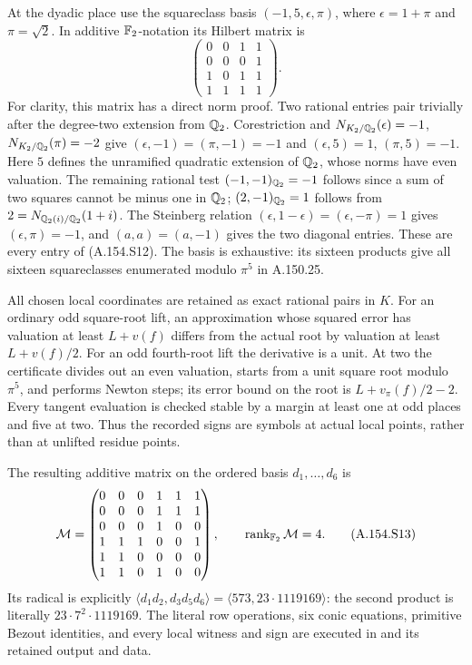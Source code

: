 At the dyadic place use the squareclass basis
\((-1,5,\epsilon,\pi)\), where
\(\epsilon=1+\pi\) and \(\pi=\sqrt2\).
In additive \(\mathbb F_2\)-notation its Hilbert matrix is
\[
 \begin{pmatrix}
 0&0&1&1\\
 0&0&0&1\\
 1&0&1&1\\
 1&1&1&1
 \end{pmatrix}.
\tag{A.154.S12}
\]
For clarity, this matrix has a direct norm proof.
Two rational entries pair trivially after the
degree-two extension from \(\mathbb Q_2\).
Corestriction and
\(N_{K_2/\mathbb Q_2}(\epsilon)=-1\),
\(N_{K_2/\mathbb Q_2}(\pi)=-2\) give
\((\epsilon,-1)=(\pi,-1)=-1\) and
\((\epsilon,5)=1\), \((\pi,5)=-1\).
Here \(5\) defines the unramified quadratic
extension of \(\mathbb Q_2\), whose norms have even
valuation.  The remaining rational test
\((-1,-1)_{\mathbb Q_2}=-1\) follows since a sum of
two squares cannot be minus one in \(\mathbb Q_2\);
\((2,-1)_{\mathbb Q_2}=1\) follows from
\(2=N_{\mathbb Q_2(i)/\mathbb Q_2}(1+i)\).
The Steinberg relation
\((\epsilon,1-\epsilon)=(\epsilon,-\pi)=1\)
gives \((\epsilon,\pi)=-1\), and
\((a,a)=(a,-1)\) gives the two diagonal
entries.  These are every entry of (A.154.S12).
The basis is exhaustive: its sixteen products
give all sixteen squareclasses enumerated
modulo \(\pi^5\) in A.150.25.

All chosen local coordinates are retained
as exact rational pairs in \(K\).
For an ordinary odd square-root lift,
an approximation whose squared error has
valuation at least \(L+v(f)\) differs from
the actual root by valuation at least
\(L+v(f)/2\).
For an odd fourth-root lift the derivative
is a unit.  At two the certificate divides
out an even valuation, starts from a unit
square root modulo \(\pi^5\), and performs
Newton steps; its error bound on the root
is \(L+v_\pi(f)/2-2\).
Every tangent evaluation is checked stable
by a margin at least one at odd places and
five at two.  Thus the recorded signs are
symbols at actual local points, rather than
at unlifted residue points.

The resulting additive matrix on the
ordered basis \(d_1,\ldots,d_6\) is
\[
 \mathcal M=
 \begin{pmatrix}
 0&0&0&1&1&1\\
 0&0&0&1&1&1\\
 0&0&0&1&0&0\\
 1&1&1&0&0&1\\
 1&1&0&0&0&0\\
 1&1&0&1&0&0
 \end{pmatrix},
 \qquad \operatorname{rank}_{\mathbb F_2}\mathcal M=4 .
\tag{A.154.S13}
\]
Its radical is explicitly
\(\langle d_1d_2,d_3d_5d_6\rangle
 =\langle573,23\cdot1119169\rangle\):
the second product is literally
\(23\cdot7^2\cdot1119169\).
The literal row operations, six conic equations,
primitive Bezout identities, and every local
witness and sign are executed in
and its retained output and data.

